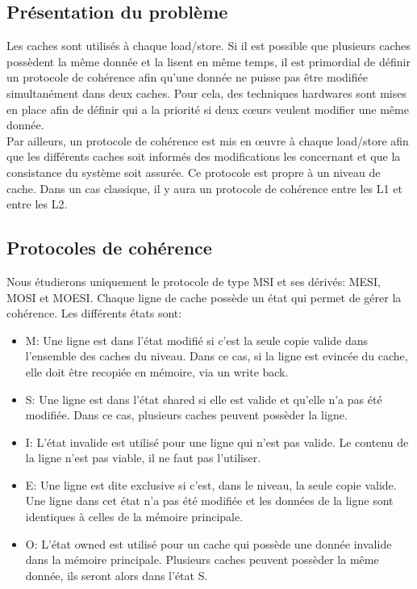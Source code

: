 \documentclass[a4paper]{article}
\begin{document}
\subsection{Présentation du problème}
\indent Les caches sont utilisés à chaque load/store. Si il est possible que plusieurs caches possèdent la même donnée et la lisent en même temps, il est primordial de définir un protocole de cohérence afin qu'une donnée ne puisse pas être modifiée simultanément dans deux caches. Pour cela, des techniques hardwares sont mises en place afin de définir qui a la priorité si deux c{\oe}urs veulent modifier une même donnée. \\

\indent Par ailleurs, un protocole de cohérence est mis en {\oe}uvre à chaque load/store afin que les différents caches soit informés des modifications les concernant et que la consistance du système soit assurée. Ce protocole est propre à un niveau de cache. Dans un cas classique, il y aura un protocole de cohérence entre les L1 et entre les L2.

\subsection{Protocoles de cohérence}
\indent Nous étudierons uniquement le protocole de type MSI et ses dérivés: MESI, MOSI et MOESI. Chaque ligne de cache possède un état qui permet de gérer la cohérence. Les différents états sont: \\
\begin{itemize}
\item M: Une ligne est dans l'état modifié si c'est la seule copie valide dans l'ensemble des caches du niveau. Dans ce cas, si la ligne est evincée du cache, elle doit être recopiée en mémoire, via un write back. \\
\item S: Une ligne est dans l'état shared si elle est valide et qu'elle n'a pas été modifiée. Dans ce cas, plusieurs caches peuvent possèder la ligne. \\
\item I: L'état invalide est utilisé pour une ligne qui n'est pas valide. Le contenu de la ligne n'est pas viable, il ne faut pas l'utiliser. \\
\item E: Une ligne est dite exclusive si c'est, dans le niveau, la seule copie valide. Une ligne dans cet état n'a pas été modifiée et les données de la ligne sont identiques à celles de la mémoire principale. \\
\item O: L'état owned est utilisé pour un cache qui possède une donnée invalide dans la mémoire principale. Plusieurs caches peuvent possèder la même donnée, ils seront alors dans l'état S. \\
\end{itemize}
\end{document}
